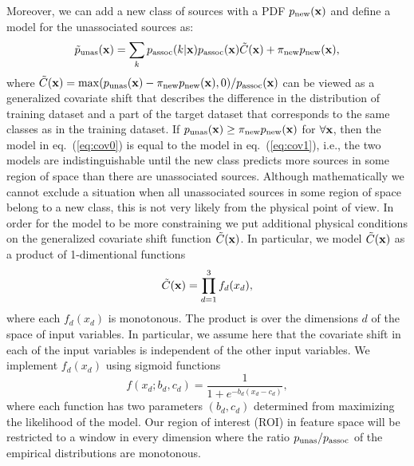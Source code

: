 \documentclass[12pt, a4paper]{article}
\newcommand{\aure}[1]{\textcolor{orange}{[AA: #1]}}
\newcommand{\dima}[1]{\textcolor{purple}{{Dima: #1}}}
\newcommand{\be}{\begin{equation}}
\newcommand{\ee}{\end{equation}}
\newcommand{\bx}{{\bf x}}
\begin{document}
Moreover, we can add a new class of sources with a PDF 
$p_{\rm new}(\bx)$ and define a model for the unassociated sources as:
\be
\label{eq:cov1}
\tilde{p}_{\rm unas}(\bx) 
= \sum_k p_{\rm assoc}(k|\bx) p_{\rm assoc}(\bx) \tilde{C}(\bx) + \pi_{\rm new} p_{\rm new}(\bx),
\ee
where 
$\tilde{C}(\bx) = {\rm max}(p_{\rm unas}(\bx) - \pi_{\rm new}p_{\rm new}(\bx), 0) / p_{\rm assoc}(\bx)$ can be viewed as a generalized covariate shift that describes the difference in the distribution of training dataset and a part of the target dataset that corresponds to the same classes as in the training dataset.
If $p_{\rm unas}(\bx) \geq \pi_{\rm new}p_{\rm new}(\bx)$ for $\forall \bx$, then 
the model in eq.~(\ref{eq:cov0}) is equal to the model in eq.~(\ref{eq:cov1}), i.e., the two models are indistinguishable until the new class predicts more sources in some region of space than there are unassociated sources.
Although mathematically we cannot exclude a situation when all unassociated sources in some region of space belong to a new class, this is not very likely from the physical point of view.
In order for the model to be more constraining we put additional physical conditions on the generalized covariate shift function $\tilde{C}(\bx)$.
In particular, we model $\tilde{C}(\bx)$ as a product of 1-dimentional functions
\be
\label{eq:cov_model}
\tilde{C}(\bx) = \prod_{d=1}^3 f_d(x_d),
\ee
where each $f_d(x_d)$ is monotonous. 
The product is over the dimensions $d$ of the space of input variables. 
In particular, we assume here that the covariate shift in each of the input variables is independent of the other input variables. 
We implement $f_d(x_d)$ using sigmoid functions
\be
\label{eq:sigmoid}
f(x_d;b_d,c_d) = \frac{1}
{1+e^{-b_d(x_d - c_d)}},
\ee
where each function has two parameters $(b_d,c_d)$ determined from maximizing the likelihood of the model. 
Our region of interest (ROI) in feature space will be restricted to a window in every dimension where the ratio 
$p_{\rm unas}/p_{\rm assoc}$ 
of the empirical distributions are monotonous. 
\end{document}
